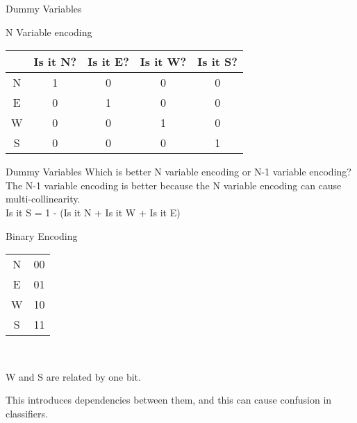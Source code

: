 \documentclass{beamer}
\begin{document}
    
    \begin{frame}{Dummy Variables}
    \begin{center}
    
    N Variable encoding\\
    \vspace{1em}
    \begin{tabular}{|c|c|c|c|c|}
    \hline
    & Is it N? &Is it E? &Is it W? & Is it S?\\
    \hline
    \hline
    N & 1&0&0&0 \\
    E & 0&1&0&0\\
    W & 0&0&1&0\\
    S & 0&0&0&1\\
    \hline
    \end{tabular}
    \end{center}
    \end{frame}
    
    
    
    \begin{frame}{Dummy Variables}
    Which is better N variable encoding or N-1 variable encoding? \\
    
    \pause The N-1 variable encoding is better because the N variable encoding can cause multi-collinearity. \\
    
    \pause Is it S = 1 - (Is it N + Is it W + Is it E) 
    
    \end{frame}
    
    
    \begin{frame}{Binary Encoding}
    
    \begin{center}
    \begin{tabular}{|c|c|}
    \hline
    N & 00 \\
    E& 01\\
    W & 10\\
    S& 11\\
    \hline
    \end{tabular}\\
    \end{center}
    
    
    \vspace{1em}
    \pause W and S are related by one bit. 
    
    \pause This introduces dependencies between them, and this can cause confusion in classifiers.
    \end{frame}
    
\end{document}
